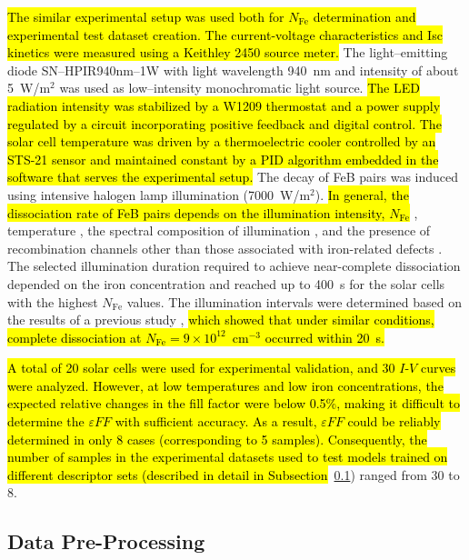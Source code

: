 \documentclass[a4paper,fleqn,draft]{cas-sc}
\begin{document}
\textcolor[rgb]{1.00,0.07,0.00}{
\hl{
The similar experimental setup was used both for $N_\mathrm{Fe}$ determination and experimental test dataset creation.
The current-voltage characteristics and Isc kinetics were measured using a Keithley 2450 source meter.
}}
The light--emitting diode SN--HPIR940nm--1W with light wavelength 940~nm and intensity of about 5~W/m$^{2}$ was used as low--intensity monochromatic light source.
\textcolor[rgb]{1.00,0.07,0.00}{
\hl{
The LED radiation intensity was stabilized by a W1209 thermostat and a power supply regulated by a circuit incorporating positive feedback and digital control.
The solar cell temperature was driven by a thermoelectric cooler controlled by an STS-21 sensor
and maintained constant by a PID algorithm embedded in the software that serves the experimental setup.
}}
The decay of FeB pairs was induced using intensive halogen lamp illumination (7000~W/m$^{2}$).
\textcolor[rgb]{1.00,0.07,0.00}{
\hl{
In general, the dissociation rate of FeB pairs depends on the illumination intensity, $N_\mathrm{Fe}$ }
\cite{FeBLight2,FeBAssJAP2014,FeMethod2012},
temperature \cite{lauer2016},
the spectral composition of illumination \cite{OlikhPSSA},
and the presence of recombination channels other than those associated with iron-related defects \cite{FeBLight2,FeBAssJAP2014}.
The selected illumination duration required to achieve near-complete dissociation depended on the iron concentration
and reached up to 400~s for the solar cells with the highest $N_\mathrm{Fe}$ values.
The illumination intervals were determined based on the results of a previous study \cite{OlikhPSSA},
\hl{which showed that under similar conditions, complete dissociation at $N_\mathrm{Fe}=9\times10^{12}$~cm$^{-3}$ occurred within 20~s.
}}


\textcolor[rgb]{1.00,0.07,0.00}{
\hl{
A total of 20 solar cells were used for experimental validation, and 30 $I$-$V$ curves were analyzed.
However, at low temperatures and low iron concentrations,
the expected relative changes in the fill factor were below 0.5\%,
making it difficult to determine the $\varepsilon F\!F$ with sufficient accuracy.
As a result, $\varepsilon F\!F$ could be reliably determined in only 8 cases (corresponding to 5 samples).
Consequently, the number of samples in the experimental datasets used to test models trained on different descriptor sets
(described in detail in Subsection}~\ref{SecDPP}) ranged from 30 to 8.
}

\subsection{Data Pre-Processing}\label{SecDPP}
\end{document}

